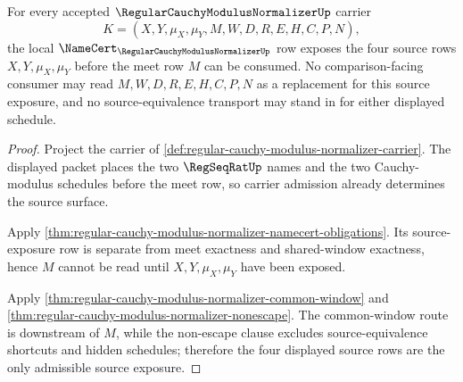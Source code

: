 \begin{theorem}
\label{thm:regular-cauchy-modulus-normalizer-source-exposure-obligation}
For every accepted $\RegularCauchyModulusNormalizerUp$ carrier
$$
K=(X,Y,\mu_X,\mu_Y,M,W,D,R,E,H,C,P,N),
$$
the local $\NameCert_{\RegularCauchyModulusNormalizerUp}$ row exposes the four source rows $X,Y,\mu_X,\mu_Y$ before the meet row $M$ can be consumed. No comparison-facing consumer may read $M,W,D,R,E,H,C,P,N$ as a replacement for this source exposure, and no source-equivalence transport may stand in for either displayed schedule.
\end{theorem}
\begin{proof}
Project the carrier of \autoref{def:regular-cauchy-modulus-normalizer-carrier}. The displayed packet places the two $\RegSeqRatUp$ names and the two Cauchy-modulus schedules before the meet row, so carrier admission already determines the source surface.

Apply \autoref{thm:regular-cauchy-modulus-normalizer-namecert-obligations}. Its source-exposure row is separate from meet exactness and shared-window exactness, hence $M$ cannot be read until $X,Y,\mu_X,\mu_Y$ have been exposed.

Apply \autoref{thm:regular-cauchy-modulus-normalizer-common-window} and \autoref{thm:regular-cauchy-modulus-normalizer-nonescape}. The common-window route is downstream of $M$, while the non-escape clause excludes source-equivalence shortcuts and hidden schedules; therefore the four displayed source rows are the only admissible source exposure.
\end{proof}


